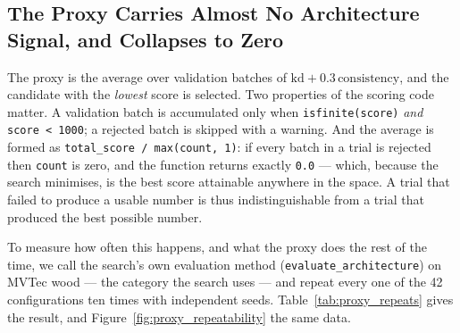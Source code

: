 \subsection{The Proxy Carries Almost No Architecture Signal, and Collapses to Zero}
\label{subsec:proxy_stability}

The proxy is the average over validation batches of
$\mathrm{kd} + 0.3\,\mathrm{consistency}$, and the candidate with the
\emph{lowest} score is selected. Two properties of the scoring code matter.
A validation batch is accumulated only when \texttt{isfinite(score)} \emph{and}
\texttt{score < 1000}; a rejected batch is skipped with a warning. And the average
is formed as \texttt{total\_score / max(count, 1)}: if every batch in a trial is
rejected then \texttt{count} is zero, and the function returns exactly
\texttt{0.0} --- which, because the search minimises, is the best score attainable
anywhere in the space. A trial that failed to produce a usable number is thus
indistinguishable from a trial that produced the best possible number.

To measure how often this happens, and what the proxy does the rest of the time,
we call the search's own evaluation method (\texttt{evaluate\_architecture}) on
MVTec wood --- the category the search uses --- and repeat every one of the 42
configurations ten times with independent seeds. Table~\ref{tab:proxy_repeats}
gives the result, and Figure~\ref{fig:proxy_repeatability} the same data.

\begin{table}[t]
\centering
\caption{Proxy repeatability, condensed. The search's own evaluation method is
called ten times for each of the 42 configurations on MVTec wood (420
evaluations). ``Zero'' is the fraction of repeats returning exactly $0.0$; ``CV''
is the within-configuration coefficient of variation, pooled over each backbone's
three dimensions. The two collapse-prone backbones are shown individually; of the
remaining twelve not one degenerate trial occurred in any repeat. All twelve
degenerate-free backbones have pooled medians spanning $7.538$--$7.971$ with CV
between $2.2\%$ and $12.1\%$, except \texttt{efficientnet\_b0}, whose pooled CV is
$74\%$ because its repeats are degenerate-free but wide.
Their per-backbone values are released with the code.}
\label{tab:proxy_repeats}

\end{table}

